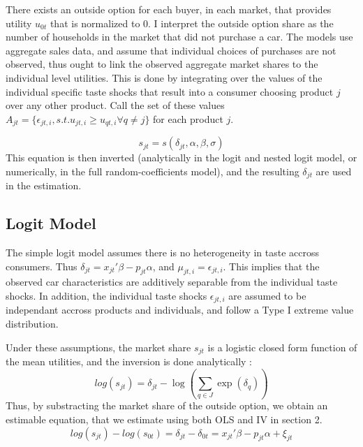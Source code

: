 \documentclass{article}\usepackage[]{graphicx}\usepackage[]{color}
\begin{document}
 
There exists an outside option for each buyer, in each market, that provides utility $u_{0t}$ that is normalized to 0. I interpret the outside option share as the number of households in the market that did not purchase a car. The models use aggregate sales data, and assume that individual choices of purchases are not observed, thus ought to link the observed aggregate market shares to the individual level utilities. This is done by integrating over the values of the individual specific taste shocks that result into a consumer choosing product $j$ over any other product. Call the set of these values $A_{jt} = \{\epsilon_{jt,i}, s.t. u_{jt,i} \geq u_{qt,i} \forall q \ne j\}$ for each product $j$.
 

\begin{equation}
s_{jt} = s(\delta_{jt}, \alpha, \beta, \sigma)
\label{eq:mktsh_2_util}
\end{equation}
This equation is then inverted (analytically in the logit and nested logit model, or numerically, in the full random-coefficients model), and the resulting $\delta_{jt}$ are used in the estimation.


\subsection{Logit Model}
The simple logit model assumes there is no heterogeneity in taste accross consumers. Thus $\delta_{jt} = x_{jt}' \beta - p_{jt} \alpha$, and $\mu_{jt,i} = \epsilon_{jt,i}$. This implies that the observed car characteristics are additively separable from the individual taste shocks. In addition, the individual taste shocks $\epsilon_{jt,i}$ are assumed to be independant accross products and individuals, and follow a Type I extreme value distribution.

Under these assumptions, the market share $s_{jt}$ is a logistic closed form function of the mean utilities, and the inversion is done analytically : 
\begin{equation}
log(s_{jt}) = \delta_{jt} - \log(\sum\limits_{q \in J} \exp(\delta_q))
\label{eq:logit1}
\end{equation}
Thus, by substracting the market share of the outside option, we obtain an estimable equation, that we estimate using both OLS and IV in section 2.
\begin{equation}
log(s_{jt}) - log(s_{0t}) = \delta_{jt} - \delta_{0t} = x_{jt}' \beta - p_{jt} \alpha + \xi_{jt}
\label{eq:logit2}
\end{equation}
\end{document}
